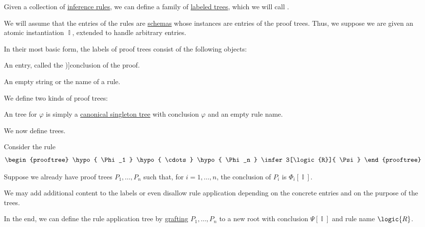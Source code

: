 \begin{definition}\label{def:proof_tree}
  Given a collection of \hyperref[def:inference_rule]{inference rules}, we can define a family of \hyperref[def:labeled_tree]{labeled trees}, which we will call .

  We will assume that the entries of the rules are \hyperref[con:schemas_and_instances]{schemas} whose instances are entries of the proof trees. Thus, we suppose we are given an atomic instantiation \( \BbbI \), extended to handle arbitrary entries.

  In their most basic form, the labels of proof trees consist of the following objects:
  \begin{thmenum}[series=def:proof_tree]
     An entry, called the \term[en=conclusion (\cite[22]{TroelstraSchwichtenberg2000BasicProofTheory})]{conclusion} of the proof.

     An empty string or the name of a rule.
  \end{thmenum}

  We define two kinds of proof trees:
  \begin{thmenum}[resume=def:proof_tree]
     An  tree for \( \varphi \) is simply a \hyperref[def:canonical_singleton_tree]{canonical singleton tree} with conclusion \( \varphi \) and an empty rule name.

     We now define  trees.

    Consider the rule
    \begin{equation*}
      \begin{prooftree}
        \hypo{ \Phi_1 }
        \hypo{ \cdots }
        \hypo{ \Phi_n }
        \infer3[\logic{R}]{ \Psi }
      \end{prooftree}
    \end{equation*}

    Suppose we already have proof trees \( P_1, \ldots, P_n \) such that, for \( i = 1, \ldots, n \), the conclusion of \( P_i \) is \( \Phi_i[\BbbI] \).

    We may add additional content to the labels or even disallow rule application depending on the concrete entries and on the purpose of the trees.

    In the end, we can define the rule application tree by \hyperref[def:ordered_tree_grafting_product]{grafting} \( P_1, \ldots, P_n \) to a new root with conclusion \( \Psi[\BbbI] \) and rule name \( \logic{R} \).


\end{thmenum}
\end{definition}
